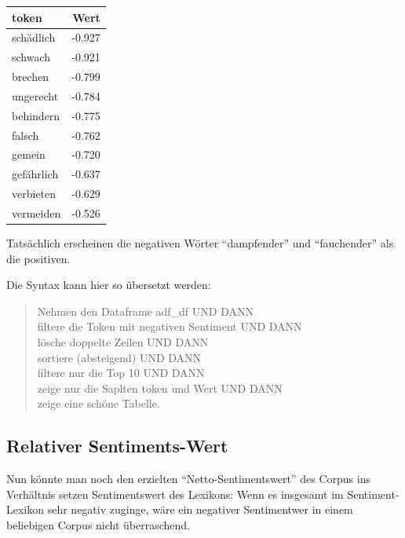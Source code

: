 \documentclass[12pt,]{book}
\newenvironment{Shaded}{\begin{snugshade}}{\end{snugshade}}
\newcommand{\KeywordTok}[1]{\textcolor[rgb]{0.13,0.29,0.53}{\textbf{{#1}}}}
\newcommand{\DataTypeTok}[1]{\textcolor[rgb]{0.13,0.29,0.53}{{#1}}}
\newcommand{\StringTok}[1]{\textcolor[rgb]{0.31,0.60,0.02}{{#1}}}
\newcommand{\NormalTok}[1]{{#1}}
\begin{document}
\begin{tabular}{l|r}
\hline
token & Wert\\
\hline
schädlich & -0.927\\
\hline
schwach & -0.921\\
\hline
brechen & -0.799\\
\hline
ungerecht & -0.784\\
\hline
behindern & -0.775\\
\hline
falsch & -0.762\\
\hline
gemein & -0.720\\
\hline
gefährlich & -0.637\\
\hline
verbieten & -0.629\\
\hline
vermeiden & -0.526\\
\hline
\end{tabular}

Tatsächlich erscheinen die negativen Wörter ``dampfender'' und
``fauchender'' als die positiven.

Die Syntax kann hier so übersetzt werden:

\begin{quote}
Nehmen den Dataframe adf\_df UND DANN\\
filtere die Token mit negativen Sentiment UND DANN\\
lösche doppelte Zeilen UND DANN\\
sortiere (absteigend) UND DANN\\
filtere nur die Top 10 UND DANN\\
zeige nur die Saplten token und Wert UND DANN\\
zeige eine schöne Tabelle.
\end{quote}

\subsection{Relativer Sentiments-Wert}\label{relativer-sentiments-wert}

Nun könnte man noch den erzielten ``Netto-Sentimentswert'' des Corpus
ins Verhältnis setzen Sentimentswert des Lexikons: Wenn es insgesamt im
Sentiment-Lexikon sehr negativ zuginge, wäre ein negativer Sentimentwer
in einem beliebigen Corpus nicht überraschend.

\begin{Shaded}
\end{Shaded}
\end{document}
